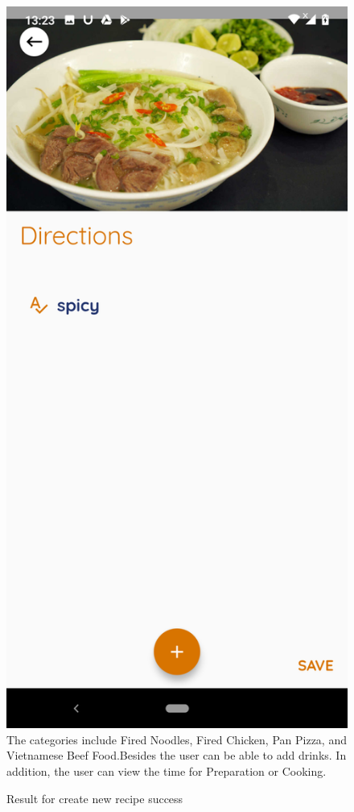 \documentclass{article}
\begin{document}
\begin{figure}[h!]
    \includegraphics[scale=0.1]{Images/pho_dire.jpg}
    The categories include Fired Noodles, Fired Chicken, Pan Pizza, and Vietnamese Beef Food.Besides the user can be able to add drinks. In addition, the user can view the time for Preparation or Cooking. 
    \caption{Result for create new recipe success}
    \label{fig:cookingbook}
    \end{figure}
\end{document}
